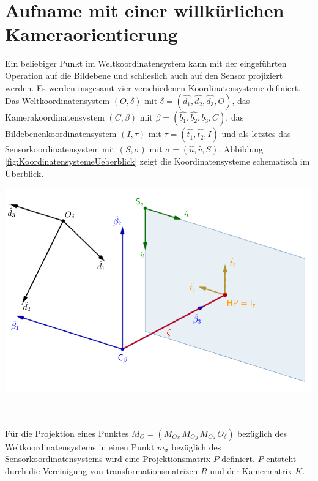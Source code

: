 \pagebreak


\section{Aufname mit einer willkürlichen Kameraorientierung}

Ein beliebiger Punkt im Weltkoordinatensystem kann mit der eingeführten Operation auf die Bildebene und schlieslich auch auf den Sensor projiziert werden. Es werden insgesamt vier verschiedenen Koordinatensysteme definiert.
Das Weltkoordinatensystem $(O,\delta)$ mit $\delta =(\hat{d_1}, \hat{d_2},\hat{d_3},O)$, das Kamerakoordinatensystem $(C,\beta)$ mit $\beta = (\hat{b_1},\hat{b_2},\hat{b_3},C)$, das Bildebenenkoordinatensystem $(I,\tau)$ mit $\tau = (\hat{t_1},\hat{t_2},I)$ und als letztes das Sensorkoordinatensystem mit $(S,\sigma)$ mit $\sigma = (\hat{u},\hat{v},S)$. Abbildung \ref{fig:KoordinatensystemeUeberblick} zeigt die Koordinatensysteme schematisch im Überblick. 


\begin{minipage}{\linewidth}
	\centering
	\includegraphics[width=0.8\linewidth]{images/UebersichtKoordinatensysteme_beschriftet.png}
	\label{fig:KoordinatensystemeUeberblick}
\end{minipage}\\ \\ 

Für die Projektion eines Punktes $M_O=({M_{Ox}}\,{M_{Oy}}\,{M_{Oz}}\,O_{\delta})$ bezüglich des Weltkoordinatensystems in einen Punkt $m_\sigma$ bezüglich des Sensorkoordinatensystems wird eine Projektionsmatrix $P$ definiert. $P$ entsteht durch die Vereinigung von transformationsmatrizen $R$ und der Kamermatrix $K$\cite{HZ}.\\

